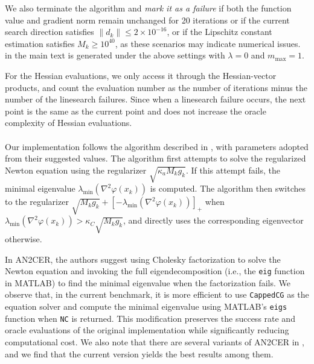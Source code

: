 We also terminate the algorithm and \emph{mark it as a failure} if both the function value and gradient norm remain unchanged for 20 iterations 
or if the current search direction satisfies $\| d_k \| \leq 2 \times 10^{-16}$, 
or if the Lipschitz constant estimation satisfies $M_k \geq 10^{40}$,
as these scenarios may indicate numerical issues.
 in the main text is generated under the above settings with $\lambda = 0$ and $m_{\mathrm{max}} = 1$.

For the Hessian evaluations, we only access it through the Hessian-vector products, 
and count the evaluation number as the number of iterations minus the number of the linesearch failures.
Since when a linesearch failure occurs, the next point is the same as the current point and does not increase the oracle complexity of Hessian evaluations.

\paragraph{}
Our implementation follows the algorithm described in \citet[Section~2]{gratton2024yet}, with parameters adopted from their suggested values.  
The algorithm first attempts to solve the regularized Newton equation using the regularizer $\sqrt{\kappa_a M_k g_k}$.
If this attempt fails, the minimal eigenvalue $\lambda_{\mathrm{min}}(\nabla^2\varphi(x_k))$ is computed.  
The algorithm then switches to the regularizer $\sqrt{M_k g_k} + [-\lambda_{\mathrm{min}}(\nabla^2\varphi(x_k))]_+$ when $\lambda_{\mathrm{min}}(\nabla^2\varphi(x_k)) > \kappa_C \sqrt{M_k g_k}$, and directly uses the corresponding eigenvector otherwise.

In AN2CER, the authors suggest using Cholesky factorization to solve the Newton equation and invoking the full eigendecomposition (i.e., the \texttt{eig} function in MATLAB) to find the minimal eigenvalue when the factorization fails.  
We observe that, in the current benchmark, it is more efficient to use \texttt{CappedCG} as the equation solver and compute the minimal eigenvalue using MATLAB's \texttt{eigs} function when \texttt{NC} is returned.  
This modification preserves the success rate and oracle evaluations of the original implementation while significantly reducing computational cost.  
We also note that there are several variants of AN2CER in \citet{gratton2024yet}, and we find that the current version yields the best results among them.




